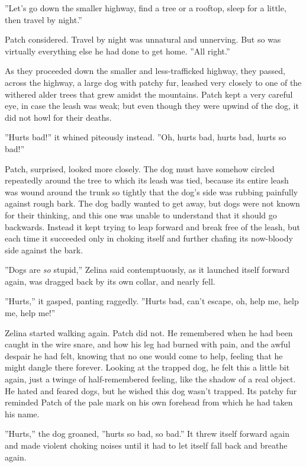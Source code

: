 \documentclass[11pt]{article}
\begin{document}
 ''Let's go down the smaller highway, find a tree or a rooftop, sleep for a little, then travel by night.''\par
 Patch considered. Travel by night was unnatural and unnerving. But so was virtually everything else he had done to get home. ''All right.''\par
 As they proceeded down the smaller and less-trafficked highway, they passed, across the highway, a large dog with patchy fur, leashed very closely to one of the withered alder trees that grew amidst the mountains. Patch kept a very careful eye, in case the leash was weak; but even though they were upwind of the dog, it did not howl for their deaths.\par
 ''Hurts bad!'' it whined piteously instead. ''Oh, hurts bad, hurts bad, hurts so bad!''\par
 Patch, surprised, looked more closely. The dog must have somehow circled repeatedly around the tree to which its leash was tied, because its entire leash was wound around the trunk so tightly that the dog's side was rubbing painfully against rough bark. The dog badly wanted to get away, but dogs were not known for their thinking, and this one was unable to understand that it should go backwards. Instead it kept trying to leap forward and break free of the leash, but each time it succeeded only in choking itself and further chafing its now-bloody side against the bark.\par
 ''Dogs are {\it so} stupid,'' Zelina said contemptuously, as it launched itself forward again, was dragged back by its own collar, and nearly fell.\par
 ''Hurts,'' it gasped, panting raggedly. ''Hurts bad, can't escape, oh, help me, help me, help me!''\par
 Zelina started walking again. Patch did not. He remembered when he had been caught in the wire snare, and how his leg had burned with pain, and the awful despair he had felt, knowing that no one would come to help, feeling that he might dangle there forever. Looking at the trapped dog, he felt this a little bit again, just a twinge of half-remembered feeling, like the shadow of a real object. He hated and feared dogs, but he wished this dog wasn't trapped. Its patchy fur reminded Patch of the pale mark on his own forehead from which he had taken his name.\par
 ''Hurts,'' the dog groaned, ''hurts so bad, so bad.'' It threw itself forward again and made violent choking noises until it had to let itself fall back and breathe again.\par
\end{document}
